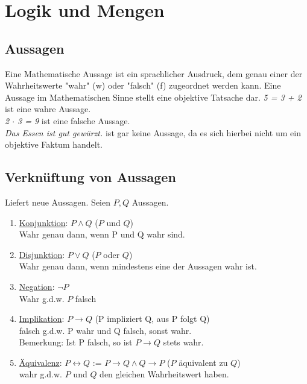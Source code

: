 %
\chapter{Logik und Mengen}
\section*{Aussagen}
Eine Mathematische Aussage ist ein sprachlicher Ausdruck, dem genau einer der Wahrheitswerte "wahr" (w) oder "falsch" (f) zugeordnet werden kann. Eine Aussage im Mathematischen Sinne stellt eine objektive Tatsache dar.
\bsp
\textit{5 = 3 + 2} ist eine wahre Aussage.\\
\textit{2 $\cdot$ 3 = 9} ist eine falsche Aussage.\\
\textit{Das Essen ist gut gewürzt.} ist gar keine Aussage, da es sich hierbei nicht um ein objektive Faktum handelt.
\section{Verknüftung von Aussagen}
Liefert neue Aussagen. Seien $P, Q$ Aussagen.
\begin{enumerate}
\item \underline{Konjunktion}: $P \wedge Q$ ($P$ und $Q$)\\
Wahr genau dann, wenn P und Q wahr sind.
\item \underline{Disjunktion}: $P \vee Q$ ($P$ oder $Q$)\\
Wahr genau dann, wenn mindestens eine der Aussagen wahr ist.
\item \underline{Negation}: $\neg P$\\
Wahr g.d.w. $P$ falsch
\item \underline{Implikation}: $P \to Q$ (P impliziert Q, aus P folgt Q)\\
falsch g.d.w. P wahr und Q falsch, sonst wahr.\\
Bemerkung: Ist P falsch, so ist $P \to Q$ stets wahr.
\item \underline{Äquivalenz}: $P \leftrightarrow Q$ :=  $P \to Q \wedge Q \to P$ ($P$ äquivalent zu $Q$)\\
wahr g.d.w. $P$ und $Q$ den gleichen Wahrheitswert haben.
\end{enumerate}
